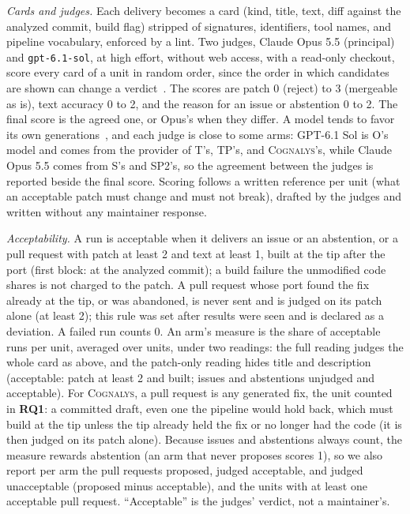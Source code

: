 \documentclass[conference]{IEEEtran}
\newcommand{\system}{\textsc{Cognalys}}
\newcommand{\researchq}[1]{\textbf{RQ#1}}
\begin{document}
\emph{Cards and judges.} Each delivery becomes a card (kind, title, text,
diff against the analyzed commit, build flag) stripped of signatures,
identifiers, tool names, and pipeline vocabulary, enforced by a lint. Two
judges, Claude Opus 5.5 (principal) and \texttt{gpt-6.1-sol}, at high effort,
without web access, with a read-only checkout, score every card of a unit in
random order, since the order in which candidates are shown can change a
verdict~\cite{wang2024fair}. The scores are patch 0 (reject) to 3 (mergeable as is), text
accuracy 0 to 2, and the reason for an issue or abstention 0 to 2. The final
score is the agreed one, or Opus's when they differ. A model tends to favor
its own generations~\cite{panickssery2024selfpref}, and each judge is close to
some arms: GPT-6.1 Sol is O's model and comes from the provider of T's, TP's,
and {\system}'s, while Claude Opus 5.5 comes from S's and SP2's, so the
agreement between the judges is reported beside the final score. Scoring follows a
written reference per unit (what an acceptable patch must change and must not
break), drafted by the judges and written without any maintainer response.

\emph{Acceptability.} A run is acceptable when it delivers an issue or an
abstention, or a pull request with patch at least 2 and text at least 1,
built at the tip after the port (first block: at the analyzed commit); a
build failure the unmodified code shares is not charged to the patch. A pull
request whose port found the fix already at the tip, or was abandoned, is
never sent and is judged on its patch alone (at least 2); this rule was set
after results were seen and is declared as a deviation.
A failed run counts 0. An arm's measure is the share of acceptable runs per
unit, averaged over units, under two readings: the full reading judges the
whole card as above, and the patch-only reading hides title and description
(acceptable: patch at least 2 and built; issues and abstentions unjudged and
acceptable). For {\system}, a pull request is any generated fix, the unit counted in
\researchq{1}: a committed draft, even one the pipeline would hold back, which
must build at the tip unless the tip already held the fix or no longer had the
code (it is then judged on its patch alone). Because issues and abstentions always
count, the measure rewards abstention (an arm that never proposes scores 1),
so we also report per arm the pull requests proposed, judged acceptable, and
judged unacceptable (proposed minus acceptable), and the units with at least
one acceptable pull request. ``Acceptable'' is the judges' verdict, not a
maintainer's.
\end{document}
